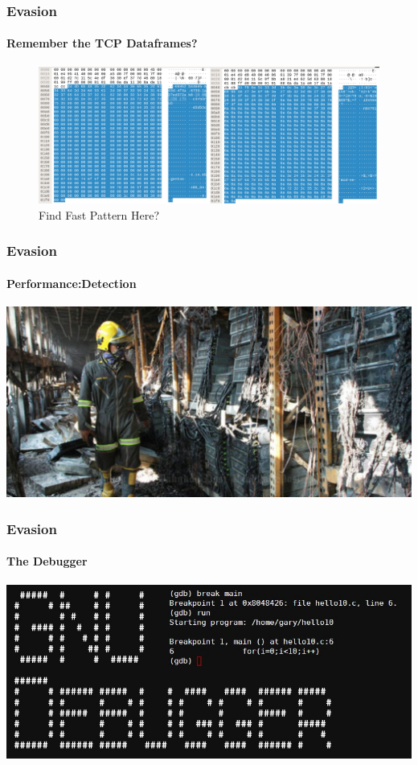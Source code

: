 \documentclass[aspectratio=169]{beamer}
\begin{document}
\begin{frame}
  \frametitle{Evasion}
  \framesubtitle{Remember the TCP Dataframes?}
  \begin{center}
    \begin{figure}
      \includegraphics[width=14cm,keepaspectratio]{tcp_xor_dataframe}
      \caption{Find Fast Pattern Here?}
    \end{figure}
  \end{center}
\end{frame}

\begin{frame}
  \frametitle{Evasion}
  \framesubtitle{Performance:Detection}
  \begin{center}
    \includegraphics[width=14cm,keepaspectratio]{server_room_fire}
  \end{center}
\end{frame}

\begin{frame}
  \frametitle{Evasion}
  \framesubtitle{The Debugger}
  \begin{center}
    \includegraphics[width=14cm,keepaspectratio]{debugger}
  \end{center}
\end{frame}
\end{document}
